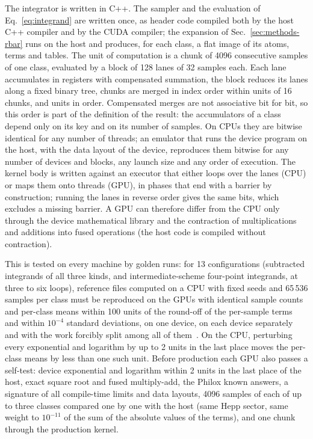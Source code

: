 The integrator is written in C++. The sampler and the evaluation of Eq.~\eqref{eq:integrand} are written once, as
header code compiled both by the host C++ compiler and by the CUDA compiler; the expansion of Sec.~\ref{sec:methods-rbar} runs on the host and produces, for
each class, a flat image of its atoms, terms and tables. The unit of computation is a chunk of 4096 consecutive samples
of one class, evaluated by a block of 128 lanes of 32 samples each. Each lane accumulates in registers with compensated
summation, the block reduces its lanes along a fixed binary tree, chunks are merged in index order within units of 16
chunks, and units in order. Compensated merges are not associative bit for bit, so this order is part of the definition
of the result: the accumulators of a class depend only on its key and on its number of samples. On CPUs they are bitwise
identical for any number of threads; an emulator that runs the device program on the host, with the data layout of the
device, reproduces them bitwise for any number of devices and blocks, any launch size and any order of execution. The
kernel body is written against an executor that either loops over the lanes (CPU) or maps them onto threads (GPU), in
phases that end with a barrier by construction; running the lanes in reverse order gives the same bits, which excludes a
missing barrier. A GPU can therefore differ from the CPU only through the device mathematical library and the contraction
of multiplications and additions into fused operations (the host code is compiled without contraction).

This is tested on every machine by golden runs: for 13 configurations (subtracted integrands of all three kinds,
and intermediate-scheme four-point integrands, at three to six loops), reference files computed on a CPU with fixed seeds
and 65\,536 samples per class must be reproduced on the GPUs with identical sample counts and per-class means within 100
units of the round-off of the per-sample terms and within $10^{-4}$ standard deviations, on one device, on each device
separately and with the work forcibly split among all of them~. On the CPU, perturbing every exponential and logarithm by up
to 2 units in the last place moves the per-class means by less than one such unit. Before production each GPU also passes
a self-test: device exponential and logarithm within 2 units in the last place of the host, exact square root and fused
multiply-add, the Philox known answers, a signature of all compile-time limits and data layouts, 4096 samples of each of up to
three classes compared one by one with the host (same Hepp sector, same weight to $10^{-11}$ of the sum of the absolute values of the
terms), and one chunk through the production kernel.

